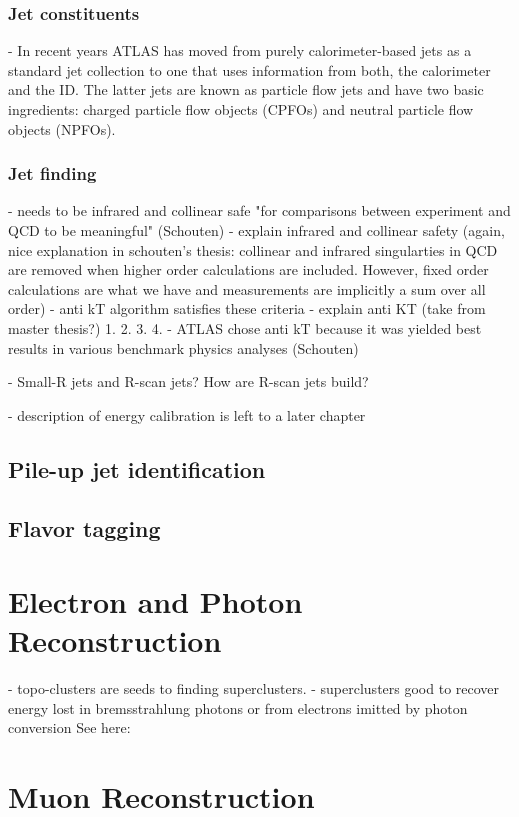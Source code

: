 \subsubsection{Jet constituents}
- In recent years ATLAS has moved from purely calorimeter-based jets as a standard jet collection to one that uses information from both, the calorimeter and the ID. The latter jets are known as particle flow jets and have two basic ingredients: charged particle flow objects (CPFOs) and neutral particle flow objects (NPFOs). 


\subsubsection{Jet finding}
- needs to be infrared and collinear safe "for comparisons between experiment and QCD to be meaningful" (Schouten)
- explain infrared and collinear safety (again, nice explanation in schouten's thesis: collinear and infrared singularties in QCD are removed when higher order calculations are included. However, fixed order calculations are what we have and measurements are implicitly a sum over all order)
- anti kT algorithm satisfies these criteria
- explain anti KT (take from master thesis?)
    1. 
    2. 
    3. 
    4.
- ATLAS chose anti kT because it was yielded best results in various benchmark physics analyses (Schouten)

- Small-R jets and R-scan jets? How are R-scan jets build?

- description of energy calibration is left to a later chapter

\subsection{Pile-up jet identification}


\subsection{Flavor tagging}


\section{Electron and Photon Reconstruction}
- topo-clusters are seeds to finding superclusters. 
- superclusters good to recover energy lost in bremsstrahlung photons or from electrons imitted by photon conversion
See here: 

\section{Muon Reconstruction}

